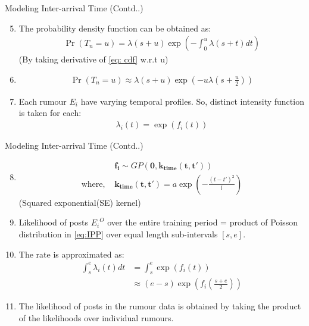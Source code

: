 \documentclass{beamer}
\providecommand{\pr}[1]{\ensuremath{\Pr\left(#1\right)}}
\providecommand{\sbrak}[1]{\ensuremath{{}\left[#1\right]}}
\providecommand{\brak}[1]{\ensuremath{\left(#1\right)}}
\let\vec\mathbf
\begin{document}
\begin{frame}{Modeling Inter-arrival Time (Contd..)}
\begin{enumerate}
\setcounter{enumi}{4}
    \item The probability density function can be obtained as:
    \begin{align}
        \pr{T_n = u} = \lambda\brak{s+u}\exp{\brak{-\int_0^u\lambda\brak{s+t}dt}} 
    \end{align}
    (By taking derivative of \eqref{eq: cdf} w.r.t u) 
    \item 
    \begin{align}
        \pr{T_n = u} \approx \lambda\brak{s+u}\exp\brak{-u \lambda\brak{s+ \frac{u}{2}}}\label{eq:inter arrival time}
    \end{align}
    \item Each rumour $E_i$ have varying temporal profiles. So, distinct intensity function is taken for each:
    \begin{align}
        \lambda_i\brak t = \exp\brak{f_i\brak t}
    \end{align}
\end{enumerate}
\end{frame}

\begin{frame}{Modeling Inter-arrival Time (Contd..)}
\begin{enumerate}
\setcounter{enumi}{7}
\item 
\begin{align}
    &\vec{f_i} \sim GP\brak{\vec{0}, \vec{k_{time}\brak{t,t'}}}\\
    \text{where, } &\vec{k_{time}\brak{t,t'}} = a \exp\brak{-\frac{\brak{t-t'}^2}{l}}
\end{align}
(Squared exponential(SE) kernel)
\item Likelihood of posts ${E_i}^O$ over the entire training period = product of Poisson distribution in \eqref{eq:IPP} over equal length sub-intervals $\sbrak{s,e}$.
\item The rate is approximated as:
\begin{align}
    \int_s^e \lambda_i\brak t dt &= \int_s^e\exp\brak{f_i\brak t}\\
    &\approx \brak{e-s}\exp\brak{f_i\brak{\frac{s+e}{2}}}
\end{align}
\item The likelihood of posts in the rumour data is obtained by taking the product of the likelihoods over individual rumours.
\end{enumerate}    
\end{frame}
\end{document}
